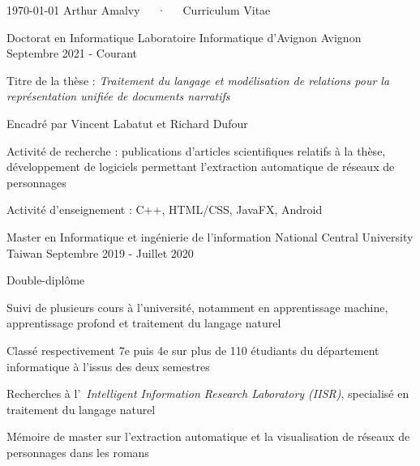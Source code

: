 \documentclass[12pt, a4paper]{awesome-cv}
\begin{document}
\makecvheader

\makecvfooter
  {\today}
  {Arthur Amalvy~~~·~~~Curriculum Vitae}
  {\thepage}




\begin{cventries}

  \cventry
  {Doctorat en Informatique} %
  {Laboratoire Informatique d'Avignon} %
  {Avignon} %
  {Septembre 2021 - Courant} %
  {
    \begin{cvitems} %
      \item Titre de la thèse : \textit{Traitement du langage et modélisation de relations pour la représentation unifiée de documents narratifs}
      \item Encadré par Vincent Labatut et Richard Dufour
      \item Activité de recherche : publications d'articles scientifiques relatifs à la thèse, développement de logiciels permettant l'extraction automatique de réseaux de personnages
      \item Activité d'enseignement : C++, HTML/CSS, JavaFX, Android
    \end{cvitems}
  }

  \cventry
  {Master en Informatique et ingénierie de l'information} %
  {National Central University} %
  {Taiwan} %
  {Septembre 2019 - Juillet 2020} %
  {
    \begin{cvitems} %
      \item Double-diplôme
      \item Suivi de plusieurs cours à l'université, notamment en apprentissage machine, apprentissage profond et traitement du langage naturel
      \item Classé respectivement 7e puis 4e sur plus de 110 étudiants du département informatique à l'issus des deux semestres
      \item Recherches à l'~\textit{Intelligent Information Research Laboratory (IISR)}, specialisé en traitement du langage naturel
      \item Mémoire de master sur l'extraction automatique et la visualisation de réseaux de personnages dans les romans
    \end{cvitems}
  }


\end{cventries}
\end{document}
